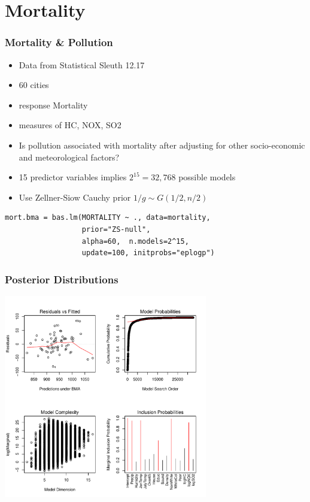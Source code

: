 \documentclass[handout]{beamer}
\begin{document}
\section{Mortality}
\begin{frame}[fragile]
\frametitle{Mortality \& Pollution}
  \begin{itemize}
  \item Data from Statistical Sleuth 12.17 \pause 
  \item 60 cities \pause 
\item response Mortality \pause 
\item measures of HC, NOX, SO2 \pause 
\item Is pollution associated with mortality after adjusting for other
  socio-economic and meteorological factors? \pause 
\item 15 predictor variables implies $2^{15} = 32,768$ possible models
  \pause 
\item Use Zellner-Siow Cauchy prior  $1/g \sim  G(1/2, n/2)$
  \end{itemize}
\begin{verbatim}
mort.bma = bas.lm(MORTALITY ~ ., data=mortality,
                  prior="ZS-null", 
                  alpha=60,  n.models=2^15, 
                  update=100, initprobs="eplogp")
\end{verbatim}
\end{frame}

\begin{frame}\frametitle{Posterior Distributions}
  \includegraphics[height=3.5in]{mort-sum}
\end{frame}
\end{document}
